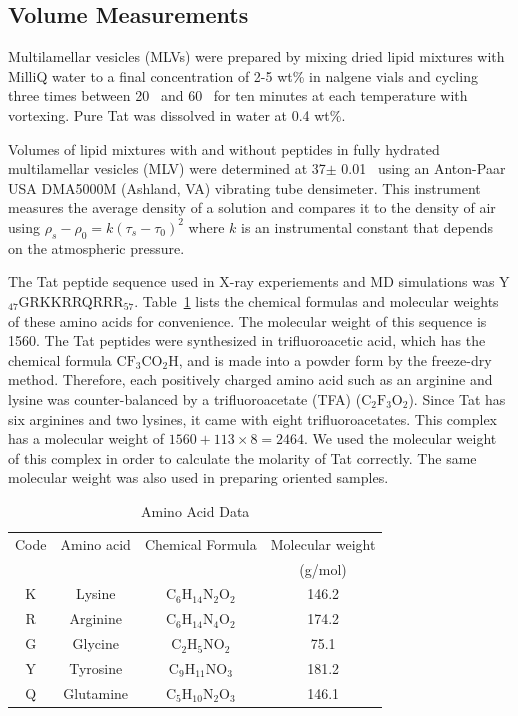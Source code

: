 \subsection{Volume Measurements}\label{sec:volume_method}
Multilamellar vesicles (MLVs) were prepared by mixing dried lipid mixtures with 
MilliQ water to a final concentration of 2-5 wt\% in nalgene vials and cycling 
three times between 20 \textcelsius\ and 60 \textcelsius\ for ten minutes at 
each temperature with vortexing. Pure Tat was dissolved in water at 0.4 wt\%.

Volumes of lipid mixtures with and without peptides in fully hydrated 
multilamellar vesicles (MLV) were determined at 37$\pm$ 0.01 \textcelsius\ 
using an Anton-Paar USA DMA5000M (Ashland, VA) vibrating tube densimeter. 
This instrument measures the average density of a solution and compares it to
the density of air using $\rho_s-\rho_0=k(\tau_s-\tau_0)^2$ where $k$ is
an instrumental constant that depends on the atmospheric pressure. 

The Tat peptide sequence used in X-ray experiements and MD simulations was 
Y$_{47}$GRKKRRQRRR$_{57}$. Table~\ref{tab:aa} lists the chemical formulas and 
molecular weights of these amino acids for convenience. The molecular weight of 
this sequence is 1560.
The Tat peptides were synthesized in trifluoroacetic acid, which has 
the chemical formula $\mathrm{CF_3CO_2H}$, and is made into a powder form by the 
freeze-dry method. Therefore, each positively charged amino acid such as 
an arginine and lysine was counter-balanced by a trifluoroacetate (TFA)
($\mathrm{C_2F_3O_2}$). Since Tat has six arginines and two lysines, it came 
with eight trifluoroacetates. This complex has a molecular weight of 
$1560+113\times 8=2464$. We used the 
molecular weight of this complex in order to calculate the molarity of Tat
correctly. The same molecular weight was also used in preparing oriented 
samples.

\begin{table}[htbp]
  \centering
  \begin{tabular}{c c c c}
    \hline
    Code & Amino acid & Chemical Formula & Molecular weight \\
    & & & (g/mol) \\
    \hline
    K & Lysine & $\mathrm{C_6H_{14}N_2O_2}$ & 146.2 \\
    R & Arginine & $\mathrm{C_6H_{14}N_4O_2}$ & 174.2 \\
    G & Glycine & $\mathrm{C_2H_5NO_2}$ & 75.1\\
    Y & Tyrosine & $\mathrm{C_9H_{11}NO_3}$ & 181.2 \\
    Q & Glutamine & $\mathrm{C_5H_{10}N_2O_3}$ & 146.1 \\ 
    \hline
  \end{tabular}
  \caption{Amino Acid Data}
  \label{tab:aa}
\end{table}

